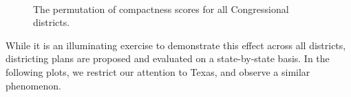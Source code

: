\begin{figure}[H]
\centering
{} 
\\[1.5em]

\caption{The permutation of compactness scores for all Congressional districts.}
\label{fig:allscores}
\end{figure}



While it is an illuminating exercise to demonstrate this effect across all districts, districting plans are proposed and evaluated on a state-by-state basis.  In the following plots, we restrict our attention to Texas, and observe a similar phenomenon.


